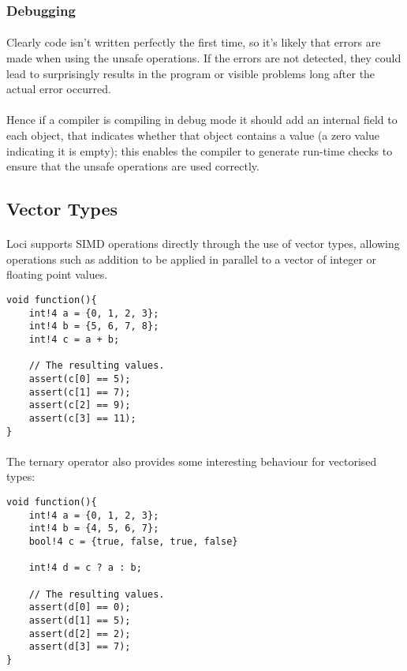 \documentclass[12pt,twoside,notitlepage]{report}
\begin{document}
\subsubsection{Debugging}

\paragraph{}
Clearly code isn't written perfectly the first time, so it's likely that errors are made when using the unsafe operations. If the errors are not detected, they could lead to surprisingly results in the program or visible problems long after the actual error occurred.

\paragraph{}
Hence if a compiler is compiling in debug mode it should add an internal field to each object, that indicates whether that object contains a value (a zero value indicating it is empty); this enables the compiler to generate run-time checks to ensure that the unsafe operations are used correctly.

\clearpage

\subsection{Vector Types}

\paragraph{}
Loci supports SIMD operations directly through the use of vector types, allowing operations such as addition to be applied in parallel to a vector of integer or floating point values.


\begin{lstlisting}
void function(){
	int!4 a = {0, 1, 2, 3};
	int!4 b = {5, 6, 7, 8};
	int!4 c = a + b;
	
	// The resulting values.
	assert(c[0] == 5);
	assert(c[1] == 7);
	assert(c[2] == 9);
	assert(c[3] == 11);
}
\end{lstlisting}


\paragraph{}
The ternary operator also provides some interesting behaviour for vectorised types:


\begin{lstlisting}
void function(){
	int!4 a = {0, 1, 2, 3};
	int!4 b = {4, 5, 6, 7};
	bool!4 c = {true, false, true, false}
	
	int!4 d = c ? a : b;
	
	// The resulting values.
	assert(d[0] == 0);
	assert(d[1] == 5);
	assert(d[2] == 2);
	assert(d[3] == 7);
}
\end{lstlisting}
\end{document}

